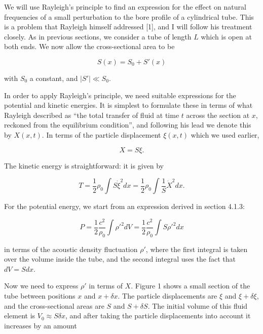   We will use Rayleigh's principle to find an expression for the effect on 
  natural frequencies of a small perturbation to the bore profile of a 
  cylindrical tube. This is a problem that Rayleigh himself addressed [1], and 
  I will follow his treatment closely. As in previous sections, we consider a 
  tube of length $L$ which is open at both ends. We now allow the 
  cross-sectional area to be 

  \begin{equation*}S(x) = S_0 +S'(x) \tag{1}\end{equation*} 

  \noindent{}with $S_0$ a constant, and $|S'| \ll S_0$. 

  In order to apply Rayleigh's principle, we need suitable expressions for the 
  potential and kinetic energies. It is simplest to formulate these in terms of 
  what Rayleigh described as ``the total transfer of fluid at time $t$ across 
  the section at $x$, reckoned from the equilibrium condition'', and following 
  his lead we denote this by $X(x,t)$. In terms of the particle displacement 
  $\xi(x,t)$ which we used earlier, 

  \begin{equation*}X=S \xi . \tag{2}\end{equation*} 

  The kinetic energy is straightforward: it is given by 

  \begin{equation*}T=\dfrac{1}{2} \rho_0 \int{S \dot{\xi}^2 dx} = \dfrac{1}{2} 
  \rho_0 \int{\dfrac{1}{S} \dot{X}^2 dx}. \tag{3}\end{equation*} 

  For the potential energy, we start from an expression derived in section 
  4.1.3: 

  \begin{equation*}P=\dfrac{1}{2} \dfrac{c^2}{\rho_0} \int{\rho'^2 
  dV}=\dfrac{1}{2} \dfrac{c^2}{\rho_0} \int{S\rho'^2 dx} \tag{4}\end{equation*} 

  \noindent{}in terms of the acoustic density fluctuation $\rho'$, where the 
  first integral is taken over the volume inside the tube, and the second 
  integral uses the fact that $dV=S dx$. 


  Now we need to express $\rho'$ in terms of $X$. Figure 1 shows a small 
  section of the tube between positions $x$ and $x+\delta x$. The particle 
  displacements are $\xi$ and $\xi + \delta \xi$, and the cross-sectional areas 
  are $S$ and $S+\delta S$. The initial volume of this fluid element is $V_0 
  \approx S \delta x$, and after taking the particle displacements into account 
  it increases by an amount 

